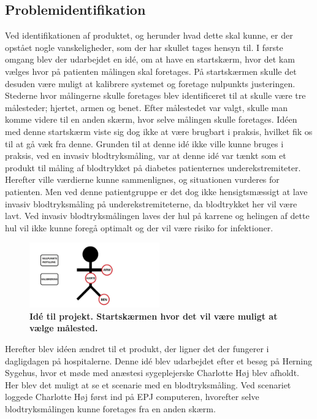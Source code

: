 \subsection{Problemidentifikation}
Ved identifikationen af produktet, og herunder hvad dette skal kunne, er der opstået nogle vanskeligheder, som der har skullet tages hensyn til. I første omgang blev der udarbejdet en idé, om at have en startskærm, hvor det kam vælges hvor på patienten målingen skal foretages. På startskærmen skulle det desuden være muligt at kalibrere systemet og foretage nulpunkts justeringen. Stederne hvor målingerne skulle foretages blev identificeret til at skulle være tre målesteder; hjertet, armen og benet. Efter målestedet var valgt, skulle man komme videre til en anden skærm, hvor selve målingen skulle foretages. Idéen med denne startskærm viste sig dog ikke at være brugbart i praksis, hvilket fik os til at gå væk fra denne. Grunden til at denne idé ikke ville kunne bruges i praksis, ved en invasiv blodtryksmåling, var at denne idé var tænkt som et produkt til måling af blodtrykket på diabetes patienternes underekstremiteter. Herefter ville værdierne kunne sammenlignes, og situationen vurderes for patienten. Men ved denne patientgruppe er det dog ikke hensigtsmæssigt at lave invasiv blodtryksmåling på underekstremiteterne, da blodtrykket her vil være lavt. Ved invasiv blodtryksmålingen laves der hul på karrene og helingen af dette hul vil ikke kunne foregå optimalt og der vil være risiko for infektioner. \\
\begin{figure}[H]
\includegraphics[width =0.5\textwidth , center]{billeder/SkitseStartGammel}
\caption{\textbf{Idé til projekt. Startskærmen hvor det vil være muligt at vælge målested.}}
\end{figure}
Herefter blev idéen ændret til et produkt, der ligner det der fungerer i dagligdagen på hospitalerne. Denne idé blev udarbejdet efter et besøg på Herning Sygehus, hvor et møde med anæstesi sygeplejerske Charlotte Høj blev afholdt. Her blev det muligt at se et scenarie med en blodtryksmåling. Ved scenariet loggede Charlotte Høj først ind på EPJ computeren, hvorefter selve blodtryksmålingen kunne foretages fra en anden skærm.\\
